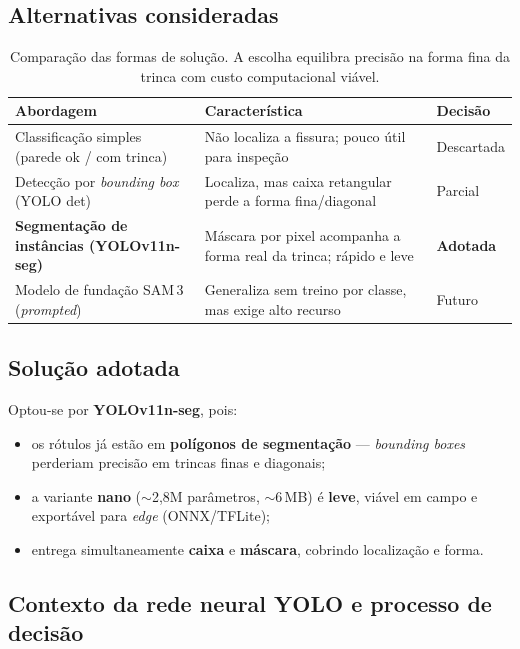 \documentclass[11pt,a4paper]{article}
\begin{document}
\subsection{Alternativas consideradas}
\begin{table}[H]\centering\small
\renewcommand{\arraystretch}{1.3}
\begin{tabular}{>{\raggedright\arraybackslash}p{4.2cm} >{\raggedright\arraybackslash}p{7.5cm} >{\centering\arraybackslash}p{2.3cm}}
\toprule
\textbf{Abordagem} & \textbf{Característica} & \textbf{Decisão} \\
\midrule
Classificação simples (parede ok / com trinca) & Não localiza a fissura; pouco útil para inspeção & Descartada \\
Detecção por \emph{bounding box} (YOLO det) & Localiza, mas caixa retangular perde a forma fina/diagonal & Parcial \\
\textbf{Segmentação de instâncias (YOLOv11n-seg)} & Máscara por pixel acompanha a forma real da trinca; rápido e leve & \textbf{Adotada} \\
Modelo de fundação SAM\,3 (\emph{prompted}) & Generaliza sem treino por classe, mas exige alto recurso & Futuro \\
\bottomrule
\end{tabular}
\caption{Comparação das formas de solução. A escolha equilibra precisão na forma fina da
trinca com custo computacional viável.}
\end{table}

\subsection{Solução adotada}
Optou-se por \textbf{YOLOv11n-seg}, pois:
\begin{itemize}[leftmargin=1.4em]
  \item os rótulos já estão em \textbf{polígonos de segmentação} — \emph{bounding boxes}
        perderiam precisão em trincas finas e diagonais;
  \item a variante \textbf{nano} (\(\sim\)2,8M parâmetros, \(\sim\)6\,MB) é \textbf{leve},
        viável em campo e exportável para \emph{edge} (ONNX/TFLite);
  \item entrega simultaneamente \textbf{caixa} e \textbf{máscara}, cobrindo localização e forma.
\end{itemize}

\subsection{Contexto da rede neural YOLO e processo de decisão}
\end{document}
